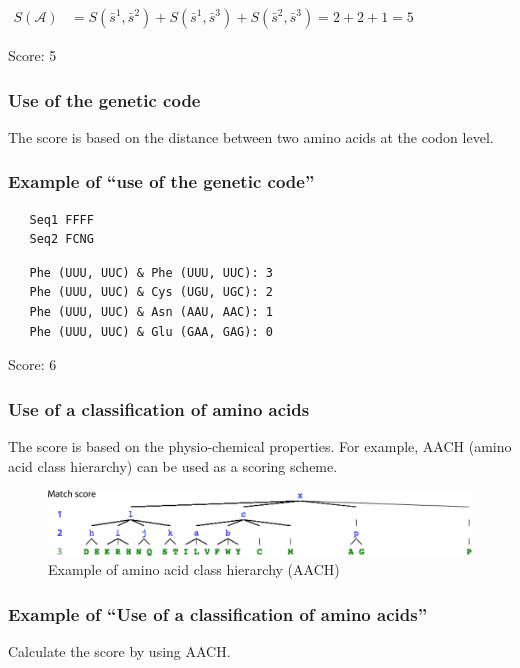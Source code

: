 \bigskip 

$\begin{aligned}
S(\mathcal{A}) &= S(\bar{s}^1, \bar{s}^2) + S(\bar{s}^1, \bar{s}^3) + S(\bar{s}^2, \bar{s}^3) = 2 + 2 + 1 = 5
\end{aligned} $

\bigskip 
Score: 5

%
%
\subsubsection*{Use of the genetic code}
The score is based on the distance between two amino acids at the codon level. 

%
%
\subsubsection*{Example of ``use of the genetic code''}

\begin{verbatim}
   Seq1 FFFF
   Seq2 FCNG
\end{verbatim}

\begin{verbatim}
   Phe (UUU, UUC) & Phe (UUU, UUC): 3
   Phe (UUU, UUC) & Cys (UGU, UGC): 2
   Phe (UUU, UUC) & Asn (AAU, AAC): 1
   Phe (UUU, UUC) & Glu (GAA, GAG): 0
\end{verbatim}

Score: 6

%
%
\subsubsection*{Use of a classification of amino acids}
The score is based on the physio-chemical properties. For example, AACH (amino acid class hierarchy) can be used as a scoring scheme.
\bigskip 

\begin{figure}[H]
  \centering
      \includegraphics[width=0.75 \textwidth]{fig11/aach.png}
  \caption{Example of amino acid class hierarchy (AACH)}
\end{figure}

%
%
\subsubsection*{Example of ``Use of a classification of amino acids''}
Calculate the score by using AACH. 

